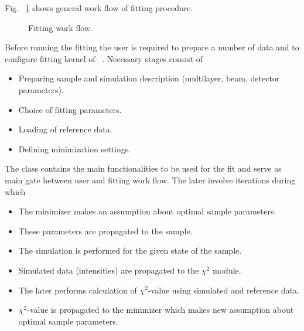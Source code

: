 Fig. ~\ref{fig:minimization_workflow} shows general work flow of fitting procedure.
\begin{figure}[htbp]
\centering
\caption{
Fitting work flow.
}
\label{fig:minimization_workflow}
\end{figure}
Before running the fitting the user is required to prepare a number of data and to
configure fitting kernel of \BornAgain\ . Necessary stages consist of

\begin{itemize}
\item Preparing sample and simulation description (multilayer, beam, detector parameters).
\item Choice of fitting parameters.
\item Loading of reference data.
\item Defining minimization settings.
\end{itemize}

The class  contains the main functionalities to be used for the fit
and serve as main gate between user and fitting work flow. 
The later involve iterations during which

\begin{itemize}
\item The minimizer makes an assumption about optimal sample parameters.
\item These parameters are propagated to the sample.
\item The simulation is performed for the given state of the sample.
\item Simulated data (intensities) are propagated to the $\chi^2$ module.
\item The later performs calculation of $\chi^2$-value using simulated and reference data.
\item $\chi^2$-value is propagated to the minimizer which makes new assumption about optimal sample parameters.
\end{itemize}

